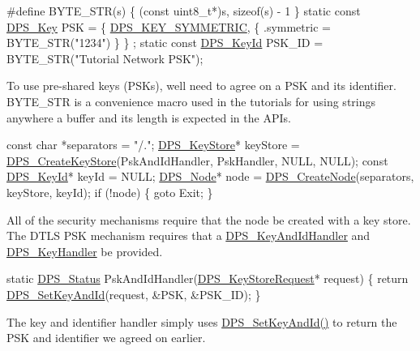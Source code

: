 \begin{DoxyCodeInclude}
\textcolor{preprocessor}{#define BYTE\_STR(s) \{ (const uint8\_t*)s, sizeof(s) - 1 \}}
\textcolor{keyword}{static} \textcolor{keyword}{const} \hyperlink{struct___d_p_s___key}{DPS\_Key} PSK = \{ \hyperlink{group__keystore_gga7ca1045749c725e9c4a1b4758b2a0196a662c1e84628d96be8ae08163af382392}{DPS\_KEY\_SYMMETRIC}, \{ .symmetric = BYTE\_STR(\textcolor{stringliteral}{"1234"}) \} \}
      ;
\textcolor{keyword}{static} \textcolor{keyword}{const} \hyperlink{struct___d_p_s___key_id}{DPS\_KeyId} PSK\_ID = BYTE\_STR(\textcolor{stringliteral}{"Tutorial Network PSK"});
\end{DoxyCodeInclude}
To use pre-\/shared keys (P\+S\+Ks), we\textquotesingle{}ll need to agree on a P\+SK and its identifier. {\ttfamily B\+Y\+T\+E\+\_\+\+S\+TR} is a convenience macro used in the tutorials for using strings anywhere a buffer and its length is expected in the A\+P\+Is.


\begin{DoxyCodeInclude}
    \textcolor{keyword}{const} \textcolor{keywordtype}{char} *separators = \textcolor{stringliteral}{"/."};
    \hyperlink{group__keystore_gaf3833cfe48f848f698514bc5daa075fa}{DPS\_KeyStore}* keyStore = \hyperlink{group__keystore_gafa79de23848ff56d0cced67897313369}{DPS\_CreateKeyStore}(PskAndIdHandler, PskHandler, 
      NULL, NULL);
    \textcolor{keyword}{const} \hyperlink{struct___d_p_s___key_id}{DPS\_KeyId}* keyId = NULL;
    \hyperlink{group__node_ga4dd612ab965134321bb57fdb065f121c}{DPS\_Node}* node = \hyperlink{group__node_gaf6641b5bbf27b2c45ac7f926b0ce4efe}{DPS\_CreateNode}(separators, keyStore, keyId);
    \textcolor{keywordflow}{if} (!node) \{
        \textcolor{keywordflow}{goto} Exit;
    \}
\end{DoxyCodeInclude}
All of the security mechanisms require that the node be created with a key store. The D\+T\+LS P\+SK mechanism requires that a \hyperlink{group__keystore_ga83d3ade4f4acd7d4385d606270ddfd29}{D\+P\+S\+\_\+\+Key\+And\+Id\+Handler} and \hyperlink{group__keystore_gaccf7e3d43bc1e586132d7f1ae03d02f7}{D\+P\+S\+\_\+\+Key\+Handler} be provided.


\begin{DoxyCodeInclude}
\textcolor{keyword}{static} \hyperlink{group__status_ga30395a84d3cad9d4ec29848106415038}{DPS\_Status} PskAndIdHandler(\hyperlink{group__keystore_ga7c3e50965b65334e9791780fa855ed16}{DPS\_KeyStoreRequest}* request)
\{
    \textcolor{keywordflow}{return} \hyperlink{group__keystore_ga289b1c74c01c9988f04297aa082986de}{DPS\_SetKeyAndId}(request, &PSK, &PSK\_ID);
\}
\end{DoxyCodeInclude}
The key and identifier handler simply uses \hyperlink{group__keystore_ga289b1c74c01c9988f04297aa082986de}{D\+P\+S\+\_\+\+Set\+Key\+And\+Id()} to return the P\+SK and identifier we agreed on earlier.


